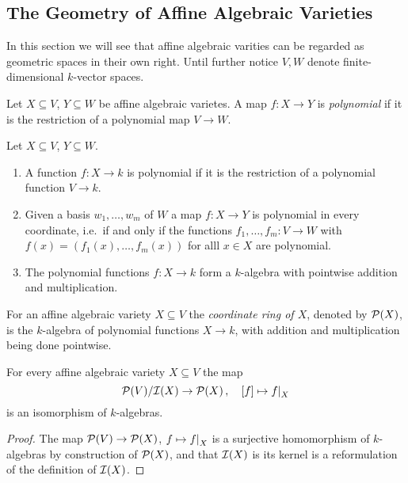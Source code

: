 \subsection{The Geometry of Affine Algebraic Varieties}


\begin{fluff}
  In this section we will see that affine algebraic varities can be regarded as geometric spaces in their own right.
  Until further notice $V, W$ denote finite-dimensional $k$-vector spaces.
\end{fluff}


\begin{definition}
  Let $X \subseteq V$, $Y \subseteq W$ be affine algebraic varietes.
  A map $f \colon X \to Y$ is \emph{polynomial} if it is the restriction of a polynomial map $V \to W$.
\end{definition}


\begin{remark}
  Let $X \subseteq V$, $Y \subseteq W$.
  \begin{enumerate}
    \item
      A function $f \colon X \to k$ is polynomial if it is the restriction of a polynomial function $V \to k$.
    \item
      Given a basis $w_1, \dotsc, w_m$ of $W$ a map $f \colon X \to Y$ is polynomial in every coordinate, i.e.\ if and only if the functions $f_1, \dotsc, f_m \colon V \to W$ with $f(x) = (f_1(x), \dotsc, f_m(x))$ for alll $x \in X$ are polynomial.
    \item
      The polynomial functions $f \colon X \to k$ form a $k$-algebra with pointwise addition and multiplication.
  \end{enumerate}
\end{remark}


\begin{definition}
  For an affine algebraic variety $X \subseteq V$ the \emph{coordinate ring of $X$}, denoted by $\mathcal{P}(X)$, is the $k$-algebra of polynomial functions $X \to k$, with addition and multiplication being done pointwise.
\end{definition}


\begin{lemma}
  For every affine algebraic variety $X \subseteq V$ the map
  \[
            \mc{P}(V)/\mc{I}(X)
    \to     \mc{P}(X) \,,
    \quad   [f]
    \mapsto \restrict{f}{X}
  \]
  is an isomorphism of $k$-algebras.
\end{lemma}


\begin{proof}
  The map $\mathcal{P}(V) \to \mathcal{P}(X)$, $f \mapsto \restrict{f}{X}$ is a surjective homomorphism of $k$-algebras by construction of $\mathcal{P}(X)$, and that $\mathcal{I}(X)$ is its kernel is a reformulation of the definition of $\mathcal{I}(X)$.
\end{proof}


